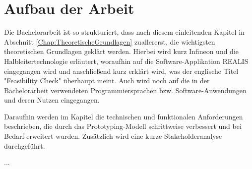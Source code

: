 \section{Aufbau der Arbeit}
Die Bachelorarbeit ist so strukturiert, dass nach diesem einleitenden Kapitel in Abschnitt \ref{Chap:TheoretischeGrundlagen} zuallererst, die wichtigsten theoretischen Grundlagen geklärt werden. 
Hierbei wird kurz Infineon und die Halbleitertechnologie erläutert, woraufhin auf die Software-Applikation \ac{REALIS} eingegangen wird und anschließend kurz erklärt wird, was der englische Titel "Feasibility Check" überhaupt meint. Auch wird noch auf die in der Bachelorarbeit verwendeten Programmiersprachen bzw. Software-Anwendungen und deren Nutzen eingegangen.

Daraufhin werden im Kapitel  die technischen und funktionalen Anforderungen beschrieben, die durch das Prototyping-Modell schrittweise verbessert und bei Bedarf erweitert wurden. Zusätzlich wird eine kurze Stakeholderanalyse durchgeführt.

...